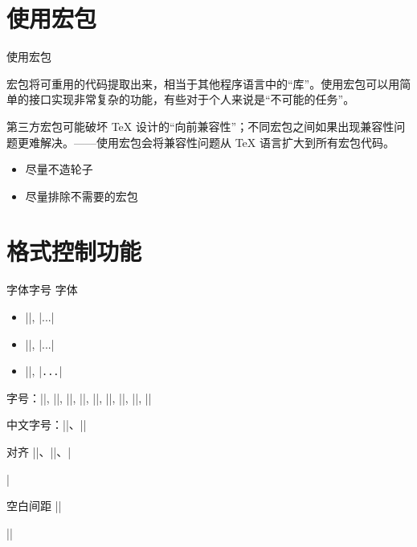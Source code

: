 \section{使用宏包}

\begin{frame}{使用宏包}
\begin{description}[<+->]
\item[作用] 宏包将可重用的代码提取出来，相当于其他程序语言中的“库”。使用宏包可以用简单的接口实现非常复杂的功能，有些对于个人来说是“不可能的任务”。
\item[问题] 第三方宏包可能破坏 \TeX{} 设计的“向前兼容性”；不同宏包之间如果出现兼容性问题更难解决。——使用宏包会将兼容性问题从 \TeX{} 语言扩大到所有宏包代码。
\end{description}
\begin{itemize}[<+->]
\item 尽量不造轮子
\item 尽量排除不需要的宏包
\end{itemize}
\end{frame}


\section{格式控制功能}

\begin{frame}[fragile]{字体字号}
字体
\begin{itemize}
\item |\rmfamily|, |\textrm{...}|
\item |\sffamily|, |\textsf{...}|
\item |\ttfamily|, |\texttt{...}|
\end{itemize}

字号：|\Huge|, |\LARGE|, |\Large|, |\large|, |\normalsize|, |\small|, |\footnotesize|, |\scriptsize|, |\tiny|

中文字号：||、||
\end{frame}

\begin{frame}[fragile]{对齐}
|\centering|、|\raggedleft|、|\raggedright|
\end{frame}

\begin{frame}[fragile]{空白间距}
|\hspace{2cm}|

|\vspace{3mm}|
\end{frame}


